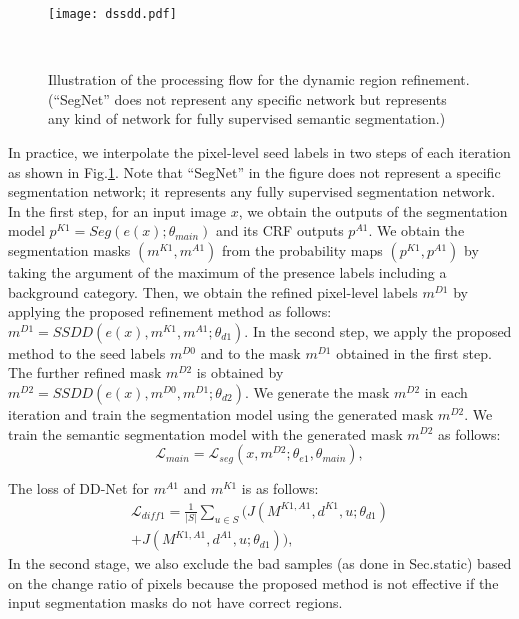\documentclass[10pt,twocolumn,letterpaper]{article}
\begin{document}
\begin{figure}[tb]
\begin{center}
\texttt{[image: dssdd.pdf]}
\caption{
Illustration of the processing flow for the dynamic region refinement. 
(``SegNet'' does not represent any specific network but represents any kind of network for fully supervised semantic segmentation.)
} \label{fig_dssdd}
\vskip -5mm~
\end{center}
\end{figure}

In practice, we interpolate the pixel-level seed labels in two steps of each iteration as shown in Fig.\ref{fig_dssdd}.
Note that ``SegNet'' in the figure does not represent a specific segmentation network; it represents any fully supervised segmentation network. 
In the first step, for an input image $x$, we obtain the outputs of the segmentation model $p^{K1}=Seg(e(x);\theta_{main})$ and its CRF outputs $p^{A1}$. 
We obtain the segmentation masks $(m^{K1},m^{A1})$ from the probability maps $(p^{K1},p^{A1})$ by taking the argument of the maximum of the presence labels including a background category.
Then, we obtain the refined pixel-level labels $m^{D1}$ by applying the proposed refinement method as follows:
$m^{D1}=SSDD(e(x), m^{K1},m^{A1};\theta_{d1})$.
In the second step, we apply the 
proposed method to the seed labels $m^{D0}$ and to the mask $m^{D1}$ obtained in the first step.
The further refined mask $m^{D2}$ is obtained by
$m^{D2}=SSDD(e(x), m^{D0},m^{D1};\theta_{d2})$.
We generate the mask $m^{D2}$ in each iteration and train the segmentation model using the generated mask $m^{D2}$.
We train the semantic segmentation model with the generated mask $m^{D2}$ as follows:
\begin{equation}
{\mathcal L}_{main}= {\mathcal L}_{seg}(x, m^{D2};\theta_{e1}, \theta_{main}) ,
\label{seedloss}
\end{equation}

The loss of DD-Net for $ m ^ {A1} $ and $ m ^ {K1} $ is as follows:
\begin{equation}
\begin{split}
{\mathcal L}_{\mathit{diff1}} = \frac{1}{|S|}\displaystyle{\sum_{u \in S}} (J(M^{K1,A1},d^{K1},u;\theta_{d1})\\
+ J(M^{K1,A1},d^{A1}, u;\theta_{d1})),
\end{split}
\end{equation}
In the second stage,
we also exclude the bad samples (as done in Sec.{static}) based on the change ratio of pixels because the proposed method
is not effective if the input segmentation masks do not have correct regions.
\end{document}
